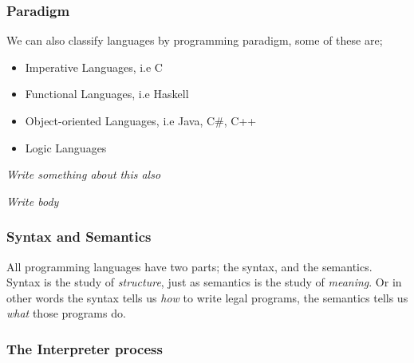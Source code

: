 \documentclass{article}
\DeclareRobustCommand{\comment}[1]{
    {\color{orange}\emph{#1}}
}
\begin{document}
        \subsubsection*{Paradigm}
        We can also classify languages by programming paradigm, some of these are; 
        \begin{itemize}
            \item Imperative Languages, i.e C
            \item Functional Languages, i.e Haskell
            \item Object-oriented Languages, i.e Java, C\#, C++
            \item Logic Languages
        \end{itemize}
        \comment{Write something about this also}
        \comment{Write body}

        \subsubsection*{Syntax and Semantics}
        All programming languages have two parts; the \gls{syntax}, and the \gls{semantics}.\\
        Syntax is the study of \textit{structure}, just as semantics is the study of \textit{meaning}. Or in other words
        the syntax tells us \textit{how} to write legal programs, the semantics tells us \textit{what} those programs do. 

        \subsubsection{The Interpreter process}
            
\end{document}
